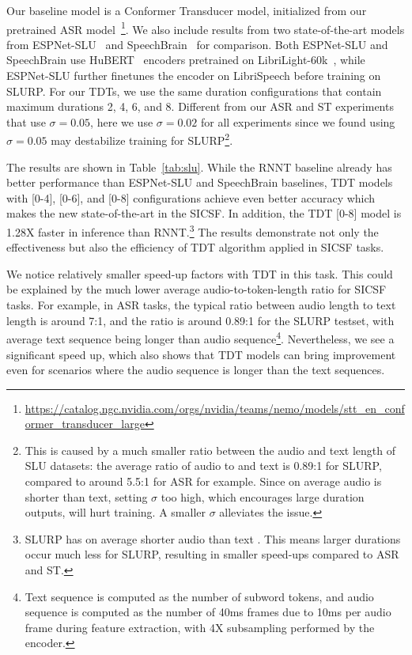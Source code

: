 \documentclass{article}
\begin{document}
Our baseline model is a Conformer Transducer model, initialized from our pretrained ASR model~\footnote{\url{https://catalog.ngc.nvidia.com/orgs/nvidia/teams/nemo/models/stt_en_conformer_transducer_large}}. 
We also include results from two state-of-the-art models from ESPNet-SLU~\cite{arora2022espnet} and SpeechBrain~\cite{wang2021fine} for comparison. Both ESPNet-SLU  and SpeechBrain  use HuBERT~\cite{hsu2021hubert} encoders pretrained on LibriLight-60k~\cite{kahn2020librilight}, while ESPNet-SLU further finetunes the encoder on LibriSpeech before training on SLURP. 
For our TDTs, we use the same duration configurations that contain maximum durations 2, 4, 6, and 8. Different from our ASR and ST experiments that use $\sigma=0.05$, here we use $\sigma=0.02$ for all experiments since we found using $\sigma=0.05$ may destabilize training for SLURP\footnote{This is caused by a much smaller ratio between the audio and text length of SLU datasets: the average ratio of audio to and text is 0.89:1 for SLURP, compared to around 5.5:1 for ASR for example. Since on average audio is shorter than text, setting $\sigma$ too high, which encourages large duration outputs, will hurt training. A smaller $\sigma$  alleviates the issue.}. 

The results are shown in Table~\ref{tab:slu}. While the RNNT baseline already has better performance than ESPNet-SLU and SpeechBrain baselines,  TDT models with [0-4], [0-6], and [0-8] configurations achieve even better accuracy which makes the new state-of-the-art in the SICSF. In addition, the TDT [0-8] model is 1.28X faster in inference  than RNNT.\footnote{SLURP has on average shorter audio than text 
. This means larger durations occur much less for SLURP, resulting in smaller speed-ups compared to ASR and ST.}
The results demonstrate not only the effectiveness but also the efficiency of TDT algorithm applied in SICSF tasks. 

We notice relatively smaller speed-up factors with TDT in this task. This could be explained by the much lower average audio-to-token-length ratio for SICSF tasks. For example, in ASR tasks, the typical ratio between audio length to text length is around 7:1, and the ratio is around 0.89:1 for the SLURP testset, with average text sequence being longer than audio sequence\footnote{Text sequence is computed as the number of subword tokens, and audio sequence is computed as the number of 40ms frames due to 10ms per audio frame during feature extraction, with 4X subsampling performed by the encoder.}. Nevertheless, we see a significant speed up, which also shows that TDT models can bring improvement even for scenarios where the audio sequence is longer than the text sequences. 
\end{document}
